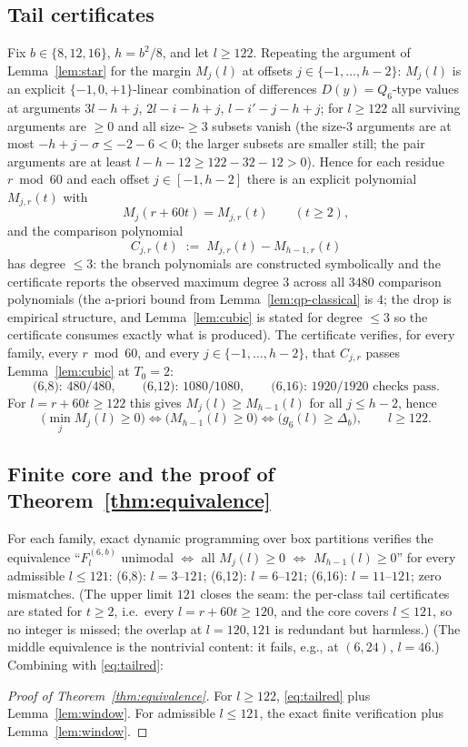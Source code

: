 \documentclass[11pt,reqno]{article}
\theoremstyle{definition}
\begin{document}
\subsection{Tail certificates}
Fix $b\in\{8,12,16\}$, $h=b^2/8$, and let $l\ge122$. Repeating the argument of Lemma~\ref{lem:star} for the margin $M_j(l)$ at offsets $j\in\{-1,\dots,h-2\}$: $M_j(l)$ is an explicit $\{-1,0,+1\}$-linear combination of differences $D(y)=Q_6$-type values at arguments $3l-h+j$, $2l-i-h+j$, $l-i'-j-h+j$; for $l\ge122$ all surviving arguments are $\ge0$ and all size-$\ge3$ subsets vanish (the size-$3$ arguments are at most $-h+j-\sigma\le -2-6<0$; the larger subsets are smaller still; the pair arguments are at least $l-h-12\ge 122-32-12>0$). Hence for each residue $r\bmod 60$ and each offset $j\in[-1,h-2]$ there is an explicit polynomial $M_{j,r}(t)$ with
\[
M_j(r+60t)=M_{j,r}(t)\qquad(t\ge2),
\]
and the comparison polynomial
\[
C_{j,r}(t)\;:=\;M_{j,r}(t)-M_{h-1,r}(t)
\]
has degree $\le 3$: the branch polynomials are constructed symbolically and the certificate reports the observed maximum degree $3$ across all $3480$ comparison polynomials (the a-priori bound from Lemma~\ref{lem:qp-classical} is $4$; the drop is empirical structure, and Lemma~\ref{lem:cubic} is stated for degree $\le3$ so the certificate consumes exactly what is produced). The certificate verifies, for every family, every $r\bmod60$, and every $j\in\{-1,\dots,h-2\}$, that $C_{j,r}$ passes Lemma~\ref{lem:cubic} at $T_0=2$:
\[
\text{(6,8): } 480/480,\qquad \text{(6,12): } 1080/1080,\qquad \text{(6,16): } 1920/1920 \text{ checks pass.}
\]
For $l=r+60t\ge122$ this gives $M_j(l)\ge M_{h-1}(l)$ for all $j\le h-2$, hence
\begin{equation}\label{eq:tailred}
\textstyle\bigl(\min_j M_j(l)\ge 0\bigr)\iff\bigl(M_{h-1}(l)\ge 0\bigr)\iff\bigl(g_6(l)\ge\Delta_b\bigr),\qquad l\ge122 .
\end{equation}

\subsection{Finite core and the proof of Theorem~\ref{thm:equivalence}}
For each family, exact dynamic programming over box partitions verifies the equivalence ``$F^{(6,b)}_l$ unimodal $\Leftrightarrow$ all $M_j(l)\ge0$ $\Leftrightarrow$ $M_{h-1}(l)\ge0$'' for every admissible $l\le121$:
(6,8): $l=3$--$121$; (6,12): $l=6$--$121$; (6,16): $l=11$--$121$; zero mismatches. (The upper limit $121$ closes the seam: the per-class tail certificates are stated for $t\ge2$, i.e.\ every $l=r+60t\ge120$, and the core covers $l\le121$, so no integer is missed; the overlap at $l=120,121$ is redundant but harmless.) (The middle equivalence is the nontrivial content: it fails, e.g., at $(6,24)$, $l=46$.) Combining with \eqref{eq:tailred}:
\begin{proof}[Proof of Theorem~\ref{thm:equivalence}]
For $l\ge122$, \eqref{eq:tailred} plus Lemma~\ref{lem:window}. For admissible $l\le121$, the exact finite verification plus Lemma~\ref{lem:window}.
\end{proof}
\end{document}
